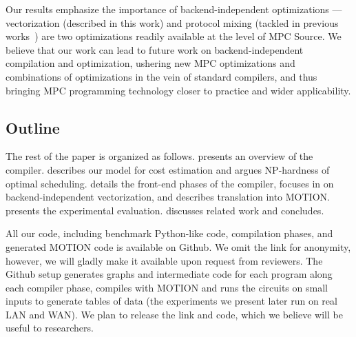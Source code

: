 Our results emphasize the importance of backend-independent optimizations --- vectorization (described in this work) and protocol mixing (tackled in previous works~\cite{CCS:BDKKS18,Ishaq:2019, Fang:2022}) are two optimizations readily available at the level of MPC Source. We believe that our work can lead to future work on backend-independent compilation and optimization, ushering new MPC optimizations and combinations of optimizations in the vein of standard compilers, and thus bringing MPC programming technology closer to practice and wider applicability.

\subsection{Outline}

The rest of the paper is organized as follows.  presents an overview of the compiler.  describes our model for cost estimation and argues NP-hardness of optimal scheduling.  details the front-end phases of the compiler,  focuses in on backend-independent vectorization, and  describes translation into MOTION.  presents the experimental evaluation. discusses related work and  concludes.

All our code, including benchmark Python-like code, compilation phases, and generated MOTION code is available on Github. We omit the link for anonymity, 
however, we will gladly make it available upon request from reviewers. The Github setup generates graphs and intermediate code for each program along each compiler phase, compiles with 
MOTION and runs the circuits on small inputs to generate tables of data (the experiments we present later run on real LAN and WAN). We plan to release the link and code, which we believe will be useful to researchers.

